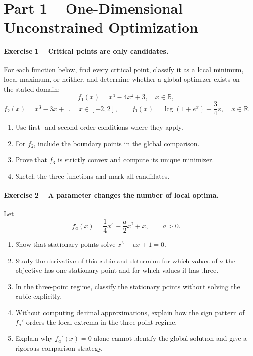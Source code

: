 \documentclass[10pt]{article}
\newcommand{\R}{\mathbb{R}}
\begin{document}
\section{Part 1 -- One-Dimensional Unconstrained Optimization}

\paragraph{Exercise 1 -- Critical points are only candidates.}
For each function below, find every critical point, classify it as a local
minimum, local maximum, or neither, and determine whether a global optimizer
exists on the stated domain:
\[
f_1(x)=x^4-4x^2+3,\quad x\in\R,
\]
\[
f_2(x)=x^3-3x+1,\quad x\in[-2,2],
\qquad
f_3(x)=\log(1+e^x)-\frac34x,\quad x\in\R.
\]
\begin{enumerate}
\item Use first- and second-order conditions where they apply.
\item For $f_2$, include the boundary points in the global comparison.
\item Prove that $f_3$ is strictly convex and compute its unique minimizer.
\item Sketch the three functions and mark all candidates.
\end{enumerate}
\paragraph{Exercise 2 -- A parameter changes the number of local optima.}
Let
\[
f_a(x)=\frac14x^4-\frac a2x^2+x,
\qquad a>0.
\]
\begin{enumerate}
\item Show that stationary points solve $x^3-ax+1=0$.
\item Study the derivative of this cubic and determine for which values of
$a$ the objective has one stationary point and for which values it has three.
\item In the three-point regime, classify the stationary points without
solving the cubic explicitly.
\item Without computing decimal approximations, explain how the sign pattern
of $f_a'$ orders the local extrema in the three-point regime.
\item Explain why $f_a'(x)=0$ alone cannot identify the global solution and
give a rigorous comparison strategy.
\end{enumerate}
\end{document}
